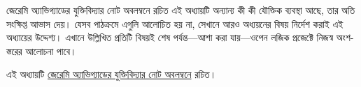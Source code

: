 \documentclass[../../../include/open-logic-chapter]{subfiles}
\begin{document}

\begin{editorial}
  জেরেমি অ্যাভিগ্যাডের যুক্তিবিদ্যার নোট অবলম্বনে রচিত এই অধ্যায়টি
  অন্যান্য কী কী যৌক্তিক ব্যবস্থা আছে, তার অতি সংক্ষিপ্ত আভাস দেয়।
  যেসব পাঠক্রমে এগুলি আলোচিত হয় না, সেখানে আরও অধ্যয়নের বিষয়
  নির্দেশ করাই এই অধ্যায়ের উদ্দেশ্য। এখানে উল্লিখিত প্রতিটি বিষয়ই
  শেষ পর্যন্ত---আশা করা যায়---ওপেন লজিক প্রজেক্টে নিজস্ব অংশ-স্তরের
  আলোচনা পাবে।
\end{editorial}

এই অধ্যায়টি \href{https://github.com/OpenLogicProject/OpenLogic/blob/9620cc73f9c8e0ad003c514a5d3748f29611c4c0/content/first-order-logic/beyond/beyond.tex\#L9-L15}{জেরেমি অ্যাভিগ্যাডের যুক্তিবিদ্যার নোট অবলম্বনে} রচিত।








\OLEndChapterHook
\end{document}
